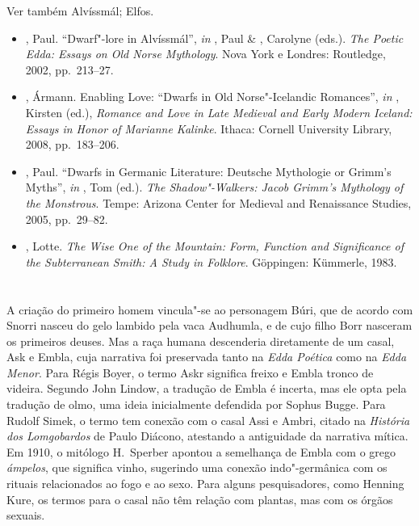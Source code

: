 Ver também Alvíssmál; Elfos.



\begin{itemize}\footnotesize
\item
  , Paul. ``Dwarf"-lore in Alvíssmál'', \emph{in}  , Paul \& ,
  Carolyne (eds.). \emph{The Poetic Edda: Essays on Old Norse
  Mythology}. Nova York e Londres: Routledge, 2002, pp.~213--27.
\item
  , Ármann. Enabling Love: ``Dwarfs in Old Norse"-Icelandic
  Romances'', \emph{in}  , Kirsten (ed.), \emph{Romance and Love in Late
  Medieval and Early Modern Iceland: Essays in Honor of Marianne
  Kalinke}. Ithaca: Cornell University Library, 2008, pp.~183--206.
\item
  , Paul. ``Dwarfs in Germanic Literature: Deutsche Mythologie or
  Grimm's Myths'', \emph{in}  , Tom (ed.). \emph{The Shadow"-Walkers: Jacob
  Grimm's Mythology of the Monstrous}. Tempe: Arizona Center for
  Medieval and Renaissance Studies, 2005, pp.~29--82.
\item
  , Lotte. \emph{The Wise One of the Mountain: Form, Function and
  Significance of the Subterranean Smith: A Study in Folklore}.
  Göppingen: Kümmerle, 1983.
\end{itemize}

\section{ }

A criação do primeiro homem vincula"-se ao personagem Búri, que de acordo
com Snorri nasceu do gelo lambido pela vaca Audhumla, e de cujo filho
Borr nasceram os primeiros deuses. Mas a raça humana descenderia
diretamente de um casal, Ask e Embla, cuja narrativa foi preservada
tanto na \emph{Edda Poética} como na \emph{Edda Menor}. Para Régis
Boyer, o termo Askr significa freixo e Embla tronco de videira. Segundo
John Lindow, a tradução de Embla é incerta, mas ele opta pela tradução
de olmo, uma ideia inicialmente defendida por Sophus Bugge. Para Rudolf
Simek, o termo tem conexão com o casal Assi e Ambri, citado na
\emph{História dos Lomgobardos} de Paulo Diácono, atestando a
antiguidade da narrativa mítica. Em 1910, o mitólogo H.~Sperber apontou
a semelhança de Embla com o grego \emph{ámpelos}, que significa vinho,
sugerindo uma conexão indo"-germânica com os rituais relacionados ao fogo
e ao sexo. Para alguns pesquisadores, como Henning Kure, os termos para
o casal não têm relação com plantas, mas com os órgãos sexuais.

